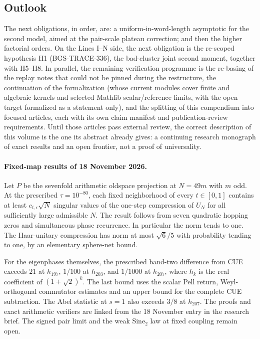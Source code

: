 \subsection{Outlook}
The next obligations, in order, are: a uniform-in-word-length asymptotic for
the second model, aimed at the pair-scale plateau correction; and
then the higher factorial orders. On the Lines I--N side, the next
obligation is the re-scoped hypothesis H1 (BGS-TRACE-336), the
bad-cluster joint second moment, together with H5--H8. In parallel, the remaining
verification programme is the re-basing of the replay notes that
could not be pinned during the restructure, the continuation of the
formalization (whose current modules cover finite and algebraic kernels and selected Mathlib scalar/reference
limits, with the open target formalized as a statement only), and the
splitting of this compendium into focused articles, each with its
own claim manifest and publication-review requirements. Until those
articles pass external review, the correct description of this volume
is the one its abstract already gives: a continuing research
monograph of exact results and an open frontier, not a proof of
universality.

\paragraph{Fixed-map results of 18 November 2026.}
Let \(P\) be the sevenfold arithmetic oldspace projection at \(N=49m\)
with \(m\) odd. At the prescribed \(\tau=10^{-80}\), each fixed
neighborhood of every \(t\in[0,1]\) contains at least
\(c_{t,\epsilon}\sqrt{N}\) singular values of the one-step compression
of \(U_N\) for all sufficiently large admissible \(N\).
The result follows from seven quadratic hopping zeros and simultaneous
phase recurrence. In particular the norm tends to one. The Haar-unitary
compression has norm at most \(\sqrt{6}/5\) with probability tending to
one, by an elementary sphere-net bound.

For the eigenphases themselves, the prescribed band-two difference
from CUE exceeds \(21\) at \(h_{197}\), \(1/100\) at \(h_{203}\), and
\(1/1000\) at \(h_{207}\), where \(h_k\) is the real coefficient of
\((1+\sqrt2)^k\). The last bound uses the scalar Pell return,
Weyl-orthogonal commutator estimates and an upper bound for the
complete CUE subtraction. The Abel statistic at \(s=1\) also exceeds
\(3/8\) at \(h_{207}\). The proofs and exact arithmetic verifiers are
linked from the 18 November entry in the research brief.
The signed pair limit and the weak Sine\(_2\) law at fixed coupling
remain open.
